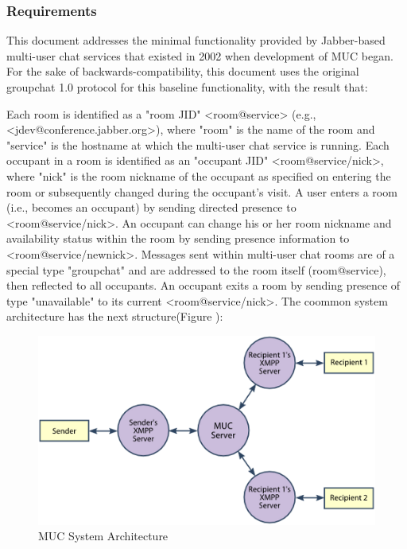 \subsubsection{Requirements}
This document addresses the minimal functionality provided by Jabber-based multi-user chat services that existed in 2002 when development of MUC began. For the sake of backwards-compatibility, this document uses the original groupchat 1.0 protocol for this baseline functionality, with the result that:

Each room is identified as a "room JID" <room@service> (e.g., <jdev@conference.jabber.org>), where "room" is the name of the room and "service" is the hostname at which the multi-user chat service is running.
Each occupant in a room is identified as an "occupant JID" <room@service/nick>, where "nick" is the room nickname of the occupant as specified on entering the room or subsequently changed during the occupant's visit.
A user enters a room (i.e., becomes an occupant) by sending directed presence to <room@service/nick>.
An occupant can change his or her room nickname and availability status within the room by sending presence information to <room@service/newnick>. Messages sent within multi-user chat rooms are of a special type "groupchat" and are addressed to the room itself (room@service), then reflected to all occupants. An occupant exits a room by sending presence of type "unavailable" to its current <room@service/nick>.
The coommon system architecture has the next structure(Figure ):
  \begin{figure}[!ht]
		\centering
		\includegraphics[scale=0.8]{images/MUC.png}   
		\caption[MUC]{MUC System Architecture}                         
		\end{figure}

